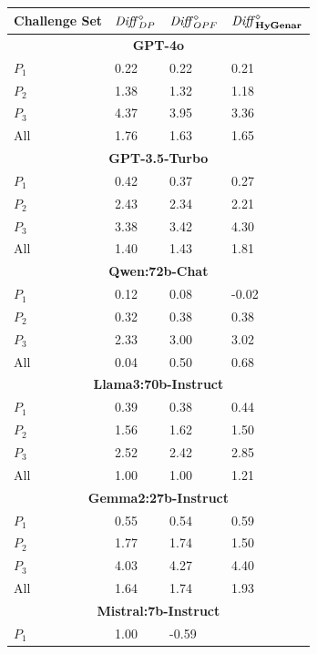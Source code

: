 \begin{table}
\centering
\begin{tabularx}{\textwidth}{l X X X}
\toprule
\textbf{Challenge Set} & \textbf{${\mathit{Diff}}^\diamond_{DP}$} & \textbf{${\mathit{Diff}}^\diamond_{OPF}$} & \textbf{${\mathit{Diff}}^\diamond_{\textbf{HyGenar}}$} \\
\midrule
\multicolumn{4}{c}{\small\textbf{GPT-4o}} \\
\midrule
$P_1$ 
& 0.22 
& 0.22 
& 0.21 \\
$P_2$ 
& 1.38 
& 1.32 
& 1.18 \\
$P_3$ 
& 4.37
& 3.95
& 3.36\\
All 
& 1.76
& 1.63 
& 1.65\\
\midrule
\multicolumn{4}{c}{\small\textbf{GPT-3.5-Turbo}} \\
\midrule
$P_1$ 
& 0.42 
& 0.37
& 0.27\\
$P_2$ 
& 2.43 
& 2.34
& 2.21\\
$P_3$ 
& 3.38 
& 3.42
& 4.30\\
All 
& 1.40 
& 1.43
& 1.81\\
\midrule
\multicolumn{4}{c}{\small\textbf{Qwen:72b-Chat}} \\
\midrule
$P_1$ 
& 0.12 
& 0.08
& -0.02\\
$P_2$ 
& 0.32 
& 0.38 
& 0.38\\
$P_3$ 
& 2.33 
& 3.00
& 3.02\\
All 
& 0.04 
& 0.50
& 0.68\\
\midrule
\multicolumn{4}{c}{\small\textbf{Llama3:70b-Instruct}} \\
\midrule
$P_1$ 
& 0.39 
& 0.38
& 0.44\\
$P_2$ 
& 1.56 
& 1.62
& 1.50\\
$P_3$ 
& 2.52 
& 2.42 
& 2.85\\
All 
& 1.00 
& 1.00 
& 1.21\\
\midrule
\multicolumn{4}{c}{\small\textbf{Gemma2:27b-Instruct}} \\
\midrule
$P_1$ 
& 0.55 
& 0.54
& 0.59\\
$P_2$ 
& 1.77 
& 1.74 
& 1.50\\
$P_3$ 
& 4.03 
& 4.27
& 4.40\\
All 
& 1.64 
& 1.74
& 1.93\\
\midrule
\multicolumn{4}{c}{\small\textbf{Mistral:7b-Instruct}} \\
\midrule
$P_1$ 
& 1.00 
& -0.59

\end{tabularx}
\end{table}
